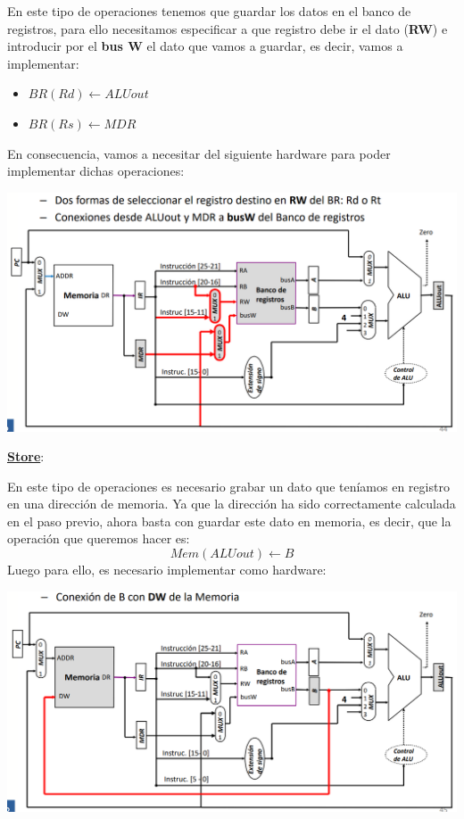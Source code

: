 \documentclass[a4paper,10pt]{book}
\begin{document}
En este tipo de operaciones tenemos que guardar los datos en el banco de registros, para ello necesitamos especificar a que registro debe ir el dato (\textbf{RW}) e introducir por el \textbf{bus W} el dato que vamos a guardar, es decir, vamos a implementar:
\begin{itemize}
\item $BR(Rd)\leftarrow ALUout$
\item $BR(Rs)\leftarrow MDR$
\end{itemize}
En consecuencia, vamos a necesitar del siguiente hardware para poder implementar dichas operaciones:
\begin{center}
\includegraphics[scale=0.6]{Escritura en banco de registros}
\end{center}

\underline{\textbf{Store}}:

En este tipo de operaciones es necesario grabar un dato que teníamos en registro en una dirección de memoria. Ya que la dirección ha sido correctamente calculada en el paso previo, ahora basta con guardar este dato en memoria, es decir, que la operación que queremos hacer es:
$$Mem(ALUout)\leftarrow B$$
Luego para ello, es necesario implementar como hardware:
\begin{center}
\includegraphics[scale=0.6]{escritura en memoria}
\end{center}
\end{document}
